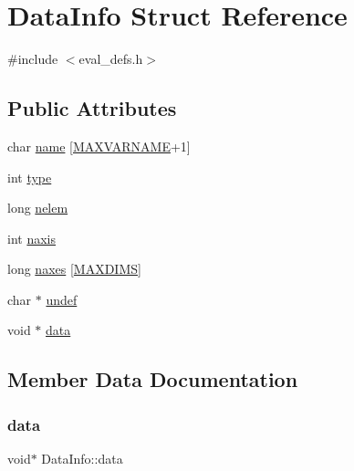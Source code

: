 \hypertarget{struct_data_info}{}\section{Data\+Info Struct Reference}
\label{struct_data_info}


{\ttfamily \#include $<$eval\+\_\+defs.\+h$>$}

\subsection*{Public Attributes}
\begin{DoxyCompactItemize}
\item 
char \hyperlink{struct_data_info_aeace22bc62f7f1f4b4435e6bdcef462f}{name} \mbox{[}\hyperlink{eval__defs_8h_a0de1b3c58ac1d494cebc79ea7e01c234}{M\+A\+X\+V\+A\+R\+N\+A\+ME}+1\mbox{]}
\item 
int \hyperlink{struct_data_info_a217c120c417bd34e477e695623880d5f}{type}
\item 
long \hyperlink{struct_data_info_a18d46d5c799d1e281161cd4e2b2e57d2}{nelem}
\item 
int \hyperlink{struct_data_info_a2b54736d7c2400cbed1746187fc96678}{naxis}
\item 
long \hyperlink{struct_data_info_ac230b052c60c1ebab3797df1bfdc0ede}{naxes} \mbox{[}\hyperlink{eval__defs_8h_a45ed35a158331b8f57fd66c5a18fa835}{M\+A\+X\+D\+I\+MS}\mbox{]}
\item 
char $\ast$ \hyperlink{struct_data_info_a7620adc9025b976f11c9d1c0c173959f}{undef}
\item 
void $\ast$ \hyperlink{struct_data_info_aa9014dae8df31b2a854d4585961a40f7}{data}
\end{DoxyCompactItemize}


\subsection{Member Data Documentation}
\mbox{\label{struct_data_info_aa9014dae8df31b2a854d4585961a40f7}} 
\subsubsection{\texorpdfstring{data}{data}}
{\footnotesize\ttfamily void$\ast$ Data\+Info\+::data}

\mbox{\label{struct_data_info_aeace22bc62f7f1f4b4435e6bdcef462f}} 
